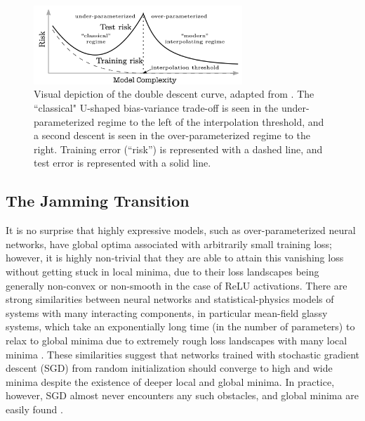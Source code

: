 \documentclass[a4paper, 12pt]{article}
\begin{document}
\begin{figure}[ht]
\centering
\includegraphics[width=0.7\textwidth]{docs/assets/double_descent_reconciling.png}
\caption{Visual depiction of the double descent curve, adapted from \cite{belkinReconcilingModernMachine2019}. The ``classical" U-shaped bias-variance trade-off is seen in the under-parameterized regime to the left of the interpolation threshold, and a second descent is seen in the over-parameterized regime to the right. Training error (``risk'') is represented with a dashed line, and test error is represented with a solid line.}
\label{doubledescent}
\end{figure}



\subsection{The Jamming Transition}

It is no surprise that highly expressive models, such as over-parameterized neural networks, have global optima associated with arbitrarily small training loss; however, it is highly non-trivial that they are able to attain this vanishing loss without getting stuck in local minima, due to their loss landscapes being generally non-convex or non-smooth in the case of ReLU activations. There are strong similarities between neural networks and statistical-physics models of systems with many interacting components, in particular mean-field glassy systems, which take an exponentially long time (in the number of parameters) to relax to global minima due to extremely rough loss landscapes with many local minima \cite{choromanskaLossSurfacesMultilayer}. These similarities suggest that networks trained with stochastic gradient descent (SGD) from random initialization should converge to high and wide minima despite the existence of deeper local and global minima. In practice, however, SGD almost never encounters any such obstacles, and global minima are easily found \cite{goodfellowQualitativelyCharacterizingNeural2015}.\\
\end{document}

